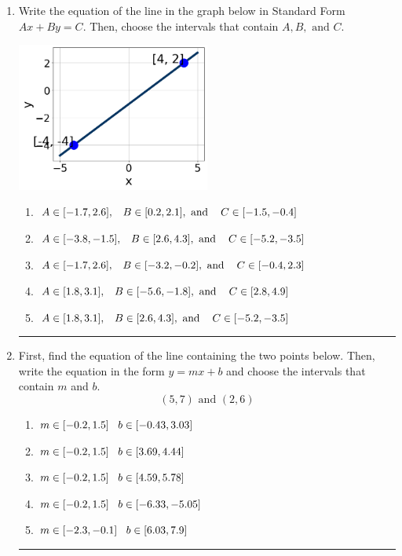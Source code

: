 \documentclass[14pt]{extbook}
\newcommand{\litem}[1]{\item#1\hspace*{-1cm}\rule{\textwidth}{0.4pt}}
\begin{document}
\begin{enumerate}
{\begin{enumerate}[label=\Alph*.]
\end{enumerate} }
\litem{
Write the equation of the line in the graph below in Standard Form $Ax+By=C$. Then, choose the intervals that contain $A, B, \text{ and } C$.
\begin{center}
    \includegraphics[width=0.5\textwidth]{../Figures/linearGraphToStandardA.png}
\end{center}
\begin{enumerate}[label=\Alph*.]
\item \( A \in [-1.7, 2.6], \hspace{3mm} B \in [0.2, 2.1], \text{ and } \hspace{3mm} C \in [-1.5, -0.4] \)
\item \( A \in [-3.8, -1.5], \hspace{3mm} B \in [2.6, 4.3], \text{ and } \hspace{3mm} C \in [-5.2, -3.5] \)
\item \( A \in [-1.7, 2.6], \hspace{3mm} B \in [-3.2, -0.2], \text{ and } \hspace{3mm} C \in [-0.4, 2.3] \)
\item \( A \in [1.8, 3.1], \hspace{3mm} B \in [-5.6, -1.8], \text{ and } \hspace{3mm} C \in [2.8, 4.9] \)
\item \( A \in [1.8, 3.1], \hspace{3mm} B \in [2.6, 4.3], \text{ and } \hspace{3mm} C \in [-5.2, -3.5] \)

\end{enumerate} }
\litem{
First, find the equation of the line containing the two points below. Then, write the equation in the form $ y=mx+b $ and choose the intervals that contain $m$ and $b$.\[ (5, 7) \text{ and } (2, 6) \]\begin{enumerate}[label=\Alph*.]
\item \( m \in [-0.2, 1.5] \hspace*{3mm} b \in [-0.43, 3.03] \)
\item \( m \in [-0.2, 1.5] \hspace*{3mm} b \in [3.69, 4.44] \)
\item \( m \in [-0.2, 1.5] \hspace*{3mm} b \in [4.59, 5.78] \)
\item \( m \in [-0.2, 1.5] \hspace*{3mm} b \in [-6.33, -5.05] \)
\item \( m \in [-2.3, -0.1] \hspace*{3mm} b \in [6.03, 7.9] \)


\end{enumerate}}
\end{enumerate}
\end{document}

